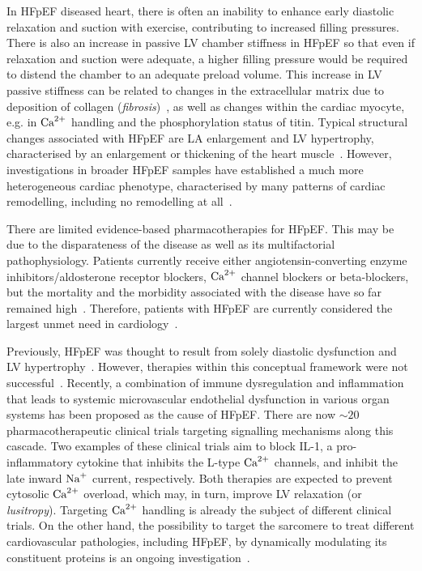 \vspace{0.2cm}
In HFpEF diseased heart, there is often an inability to enhance early diastolic relaxation and suction with exercise, contributing to increased filling pressures. There is also an increase in passive LV chamber stiffness in HFpEF so that even if relaxation and suction were adequate, a higher filling pressure would be required to distend the chamber to an adequate preload volume. This increase in LV passive stiffness can be related to changes in the extracellular matrix due to deposition of collagen (\textit{fibrosis})~\cite{Burlew:2002}, as well as changes within the cardiac myocyte, e.g. in $\textrm{Ca}^{2+}$ handling and the phosphorylation status of titin. Typical structural changes associated with HFpEF are LA enlargement and LV hypertrophy, characterised by an enlargement or thickening of the heart muscle~\cite{Zile:2004}. However, investigations in broader HFpEF samples have established a much more heterogeneous cardiac phenotype, characterised by many patterns of cardiac remodelling, including no remodelling at all~\cite{Shah:2012}.

\vspace{0.2cm}
There are limited evidence-based pharmacotherapies for HFpEF. This may be due to the disparateness of the disease as well as its multifactorial pathophysiology. Patients currently receive either angiotensin-converting enzyme inhibitors/aldosterone receptor blockers, $\textrm{Ca}^{2+}$ channel blockers or beta-blockers, but the mortality and the morbidity associated with the disease have so far remained high~\cite{Adamczak:2020}. Therefore, patients with HFpEF are
currently considered the largest unmet need in cardiology~\cite{Owan:2006}.

\vspace{0.2cm}
Previously, HFpEF was thought to result from solely diastolic dysfunction and LV hypertrophy~\cite{Patel:2019}. However, therapies within this conceptual framework were not successful~\cite{Cleland:2014}. Recently, a combination of immune dysregulation and inflammation that leads to systemic microvascular endothelial dysfunction in various organ systems has been proposed as the cause of HFpEF. There are now $\sim 20$ pharmacotherapeutic clinical trials targeting signalling mechanisms along this cascade. Two examples of these clinical trials aim to block IL-1, a pro-inflammatory cytokine that inhibits the L-type $\textrm{Ca}^{2+}$ channels, and inhibit the late inward $\textrm{Na}^{+}$ current, respectively. Both therapies are expected to prevent cytosolic $\textrm{Ca}^{2+}$ overload, which may, in turn, improve LV relaxation (or \textit{lusitropy}). Targeting $\textrm{Ca}^{2+}$ handling is already the subject of different clinical trials. On the other hand, the possibility to target the sarcomere to treat different cardiovascular pathologies, including HFpEF, by dynamically modulating its constituent proteins is an ongoing investigation~\cite{Patel:2019}.


